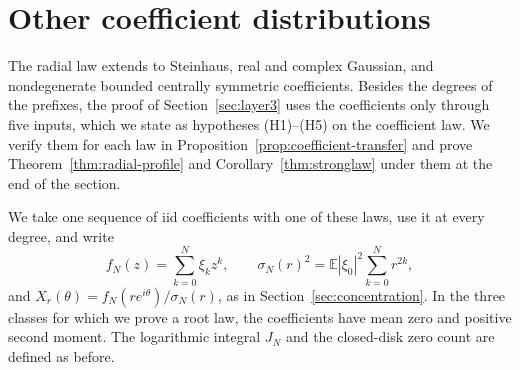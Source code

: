 \section{Other coefficient distributions}
\label{sec:layer2-models}\label{par:central-symmetry}
The radial law extends to Steinhaus, real and complex Gaussian, and
nondegenerate bounded centrally symmetric coefficients. Besides the degrees of the
prefixes, the proof of Section~\ref{sec:layer3} uses the coefficients
only through five inputs, which we state as hypotheses (H1)--(H5) on the
coefficient law. We verify them for each law in
Proposition~\ref{prop:coefficient-transfer} and prove
Theorem~\ref{thm:radial-profile} and Corollary~\ref{thm:stronglaw} under
them at the end of the section.

We take one sequence of iid coefficients with one of these laws, use it
at every degree, and write
\[
 f_N(z)=\sum_{k=0}^N\xi_kz^k,\qquad
 \sigma_N(r)^2=\mathbb E|\xi_0|^2\sum_{k=0}^Nr^{2k},
\]
and $X_r(\theta)=f_N(re^{i\theta})/\sigma_N(r)$, as in
Section~\ref{sec:concentration}.
In the three classes for which we prove a root law, the coefficients have
mean zero and positive second moment.
The logarithmic integral $J_N$ and the closed-disk zero count are
defined as before.

